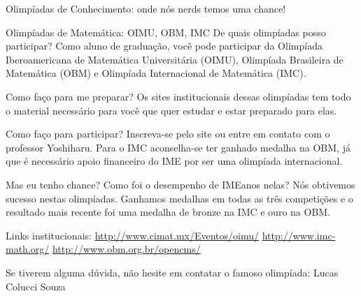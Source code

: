 \begin{secao}{Olimpíadas de Conhecimento: onde nós nerds temos uma chance!}
\begin{subsecao}{Olimpíadas de Matemática: OIMU, OBM, IMC}
De quais olimpíadas posso participar? Como aluno de graduação, você pode
participar da Olimpíada Iberoamericana de Matemática Universitária (OIMU),
Olimpíada Brasileira de Matemática (OBM) e Olimpíada Internacional de 
Matemática (IMC).

Como faço para me preparar? Os sites institucionais dessas olimpíadas
tem todo o material necessário para você que quer estudar e estar preparado
para elas.

Como faço para participar? Inscreva-se pelo site ou entre em contato com
o professor Yoshiharu. Para o IMC aconselha-se ter ganhado medalha na OBM,
já que é necessário apoio financeiro do IME por ser uma olimpíada internacional.

Mas eu tenho chance? Como foi o desempenho de IMEanos nelas? Nós obtivemos
sucesso nestas olimpíadas. Ganhamos medalhas em todas as três competições e
o resultado mais recente foi uma medalha de bronze na IMC e ouro na OBM.

Links institucionais:
\url{http://www.cimat.mx/Eventos/oimu/}
\url{http://www.imc-math.org/}
\url{http://www.obm.org.br/opencms/}

Se tiverem alguma dúvida, não hesite em contatar o famoso olimpíada:
Lucas Colucci Souza

\end{subsecao}

\end{secao}
